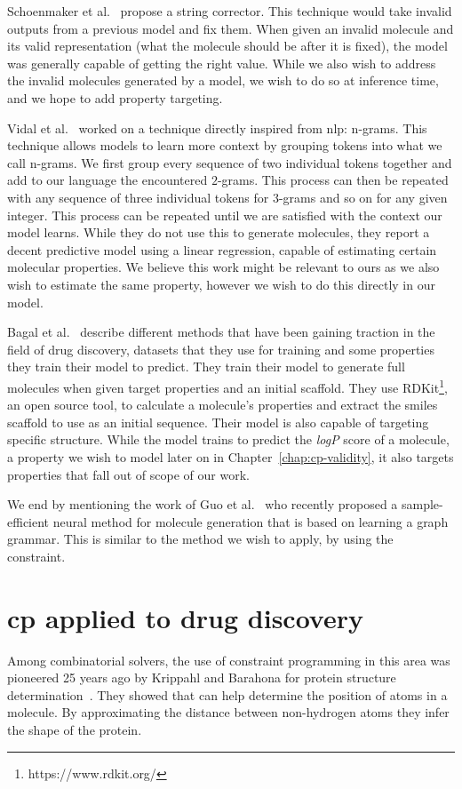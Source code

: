\documentclass[../Document.tex]{subfiles}
\begin{document}
Schoenmaker et al.~\cite{schoenmaker_uncorrupt_2023} propose a \smiles string corrector. This technique would take invalid outputs from a previous model and fix them. When given an invalid molecule and its valid representation (\ie what the molecule should be after it is fixed), the model was generally capable of getting the right value. While we also wish to address the invalid molecules generated by a model, we wish to do so at inference time, and we hope to add property targeting.

Vidal et al.~\cite{lingos} worked on a technique directly inspired from \gls{nlp}: n-grams.
This technique allows models to learn more context by grouping tokens into what we call n-grams.
We first group every sequence of two individual tokens together and add to our language the encountered $2$-grams.
This process can then be repeated with any sequence of three individual tokens for $3$-grams and so on for any given integer.
This process can be repeated until we are satisfied with the context our model learns.
While they do not use this to generate molecules, they report a decent predictive model using a linear regression, capable of estimating certain molecular properties. We believe this work might be relevant to ours as we also wish to estimate the same property, however we wish to do this directly in our \cp model.

Bagal et al.~\cite{bagal_molgpt_2022} describe different methods that have been gaining traction in the field of drug discovery, datasets that they use for training and some properties they train their model to predict.
They train their model to generate full molecules when given target properties and an initial scaffold.
They use RDKit\footnote{https://www.rdkit.org/}, an open source tool, to calculate a molecule's properties and extract the \gls{smiles} scaffold to use as an initial sequence.
Their model is also capable of targeting specific structure.
While the model trains to predict the \emph{logP} score of a molecule, a property we wish to model later on in Chapter~\ref{chap:cp-validity}, it also targets properties that fall out of scope of our work.

We end by mentioning the work of Guo et al.~\cite{guo2022dataefficient} who recently proposed a sample-efficient neural method for molecule generation that is based on learning a graph grammar. This is similar to the method we wish to apply, by using the \grammar constraint.


\section{\acrshort{cp} applied to drug discovery}
\label{sec:lit-review/cp}
Among combinatorial solvers, the use of constraint programming in this area was pioneered 25 years ago by Krippahl and Barahona for protein structure determination~\cite{DBLP:conf/cp/KrippahlB99}.
They showed that \cp can help determine the position of atoms in a molecule.
By approximating the distance between non-hydrogen atoms they infer the shape of the protein.
\end{document}
